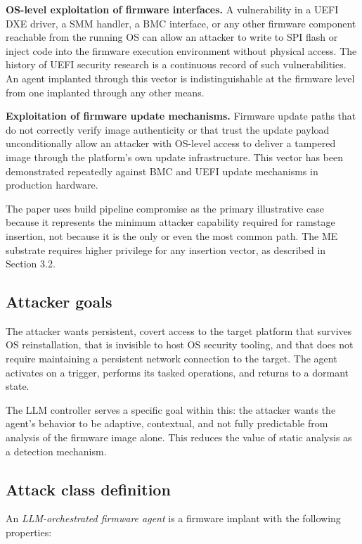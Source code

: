 \documentclass[11pt,a4paper]{article}
\begin{document}
\textbf{OS-level exploitation of firmware interfaces.} A vulnerability in a UEFI DXE driver, a SMM handler, a BMC interface, or any other firmware component reachable from the running OS can allow an attacker to write to SPI flash or inject code into the firmware execution environment without physical access. The history of UEFI security research is a continuous record of such vulnerabilities. An agent implanted through this vector is indistinguishable at the firmware level from one implanted through any other means.

\textbf{Exploitation of firmware update mechanisms.} Firmware update paths that do not correctly verify image authenticity or that trust the update payload unconditionally allow an attacker with OS-level access to deliver a tampered image through the platform's own update infrastructure. This vector has been demonstrated repeatedly against BMC and UEFI update mechanisms in production hardware.

The paper uses build pipeline compromise as the primary illustrative case because it represents the minimum attacker capability required for ramstage insertion, not because it is the only or even the most common path. The ME substrate requires higher privilege for any insertion vector, as described in Section 3.2.

\subsection{Attacker goals}

The attacker wants persistent, covert access to the target platform that survives OS reinstallation, that is invisible to host OS security tooling, and that does not require maintaining a persistent network connection to the target. The agent activates on a trigger, performs its tasked operations, and returns to a dormant state.

The LLM controller serves a specific goal within this: the attacker wants the agent's behavior to be adaptive, contextual, and not fully predictable from analysis of the firmware image alone. This reduces the value of static analysis as a detection mechanism.

\subsection{Attack class definition}

An \textit{LLM-orchestrated firmware agent} is a firmware implant with the following properties:
\end{document}
